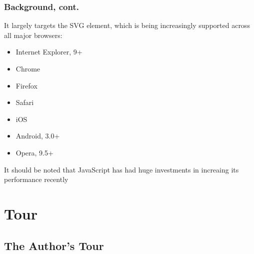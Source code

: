 \documentclass{beamer}
\begin{document}
\begin{frame}
\frametitle{Background, cont.}
It largely targets the SVG element, which is being increasingly supported across all major browsers:
    \begin{itemize}
    \item Internet Explorer, 9+
    \item Chrome
    \item Firefox
    \item Safari
    \item iOS
    \item Android, 3.0+
    \item Opera, 9.5+
    \end{itemize}
It should be noted that JavaScript has had huge investments in increaing its performance recently
\end{frame}



\section{Tour}


\subsection{The Author's Tour}
\end{document}
